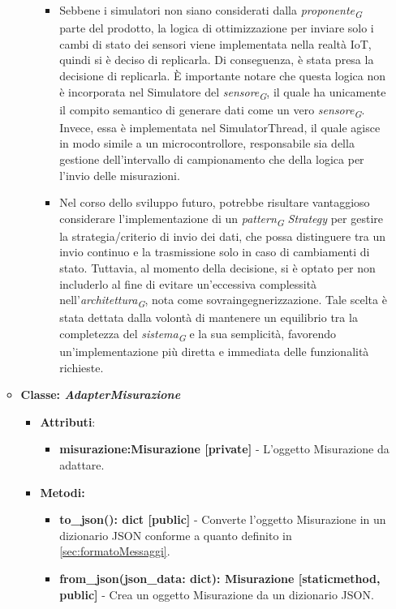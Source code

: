 \begin{itemize}
\begin{itemize}
\begin{itemize}
\begin{itemize}
            \item Sebbene i simulatori non siano considerati dalla \textit{proponente}\textsubscript{\textit{G}} parte del prodotto, la logica di ottimizzazione per inviare solo i cambi di stato dei sensori viene implementata nella realtà IoT, quindi si è deciso di replicarla. Di conseguenza, è stata presa la decisione di replicarla. È importante notare che questa logica non è incorporata nel Simulatore del \textit{sensore}\textsubscript{\textit{G}}, il quale ha unicamente il compito semantico di generare dati come un vero \textit{sensore}\textsubscript{\textit{G}}. Invece, essa è implementata nel SimulatorThread, il quale agisce in modo simile a un microcontrollore, responsabile sia della gestione dell'intervallo di campionamento che della logica per l'invio delle misurazioni.
            \item Nel corso dello sviluppo futuro, potrebbe risultare vantaggioso considerare l'implementazione di un \textit{pattern}\textsubscript{\textit{G}} \textit{Strategy} per gestire la strategia/criterio di invio dei dati, che possa distinguere tra un invio continuo e la trasmissione solo in caso di cambiamenti di stato. Tuttavia, al momento della decisione, si è optato per non includerlo al fine di evitare un'eccessiva complessità nell'\textit{architettura}\textsubscript{\textit{G}}, nota come sovraingegnerizzazione. Tale scelta è stata dettata dalla volontà di mantenere un equilibrio tra la completezza del \textit{sistema}\textsubscript{\textit{G}} e la sua semplicità, favorendo un'implementazione più diretta e immediata delle funzionalità richieste.
        \end{itemize}
    \end{itemize}
    \item{\textbf{Classe: \textit{AdapterMisurazione}}}
    \begin{itemize}
    \item\textbf{Attributi}:
        \begin{itemize}
        \item \textbf{misurazione:Misurazione [private]} - L'oggetto Misurazione da adattare.
    \end{itemize}
    \item \textbf{Metodi: }
    \begin{itemize}
        \item \textbf{to\_json(): dict [public]} - Converte l'oggetto Misurazione in un dizionario JSON conforme a quanto definito in \ref{sec:formatoMessaggi}.
        \item \textbf{from\_json(json\_data: dict): Misurazione [staticmethod, public]} - Crea un oggetto Misurazione da un dizionario JSON.

\end{itemize}
\end{itemize}
\end{itemize}
\end{itemize}
